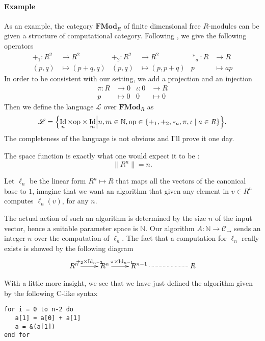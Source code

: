\documentclass{article}
\newcommand{\cat}[1]{\mathscr{#1}}
\newcommand{\lcat}[1]{\mathbf{#1}}
\newcommand{\C}{\cat{C}}
\renewcommand{\L}{\cat{L}}
\newcommand{\size}[1]{\lVert#1\rVert}
\DeclareMathOperator{\Id}{Id}
\newcommand{\N}{\mathbb{N}}
\newcommand{\ra}{\rightarrow}
\begin{document}
  \paragraph{Example}
  As an example, the category $\lcat{FMod}_R$ of finite dimensional
  free $R$-modules can be given a structure of computational
  category. Following \cite{BLS03}, we give the following operators
  \begin{align*}
    +_1 : R^2 &\ra R^2         &   +_2 : R^2&\ra R^2       &  *_a : R&\ra R\\
         (p,q)&\mapsto(p+q,q)  &      (p,q)&\mapsto(p,p+q) &       p&\mapsto ap
  \end{align*}
  In order to be consistent with our setting, we add a projection and
  an injection
  \begin{align*}
    \pi : R&\ra 0     &  \iota : 0&\ra R   \\
          p&\mapsto0  &          0&\mapsto0
  \end{align*}
  Then we define the language $\L$ over $\lcat{FMod}_R$ as 
  \begin{equation}
    \label{eq:linlang}
    \L = \Bigl\{\Id_n\times\mathrm{op}\times\Id_m \Bigl\lvert
    n,m\in\N, \mathrm{op}\in\{+_1,+_2,*_a,\pi,\iota\;|\;a\in R\} \Bigr\}
    \text{.}
  \end{equation}
  The completeness of the language is not obvious and I'll prove it
  one day.

  The space function is exactly what one would expect it to be :
  \begin{equation}
    \size{R^n} = n \text{.}
  \end{equation}
  
  Let $\ell_n$ be the linear form $R^n\mapsto R$ that maps all the
  vectors of the canonical base to $1$, imagine that we want an
  algorithm that given any element in $v\in R^n$ computes $\ell_n(v)$,
  for any $n$.

  The actual action of such an algorithm is determined by the size $n$
  of the input vector, hence a suitable parameter space is $\N$. Our
  algorithm $A:\N\ra\C_\ra$ sends an integer $n$ over the computation
  of $\ell_n$. The fact that a computation for $\ell_n$ really exists
  is showed by the following diagram
  \[\xymatrix{
    R^n\ar[r]^{+_2\times{\Id_{n-2}}} & R^n\ar[r]^{\pi\times{\Id_{n-1}}} &
    R^{n-1} \ar@{.}[rr] && R
  }\]
  
  With a little more insight, we see that we have just defined the
  algorithm given by the following C-like syntax
  \begin{center}
    \begin{minipage}{0.7\textwidth}
\begin{verbatim}
for i = 0 to n-2 do
   a[1] = a[0] + a[1]
   a = &(a[1])
end for
\end{verbatim}
    \end{minipage}
  \end{center}
\end{document}
